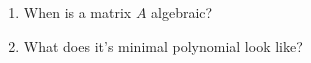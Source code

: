 \documentclass[preview]{standalone}
\begin{document}
\begin{center}
\begin{enumerate} \item When is a matrix $A$ algebraic? \item What does it’s minimal polynomial look like? \end{enumerate}
\end{center}
\end{document}
